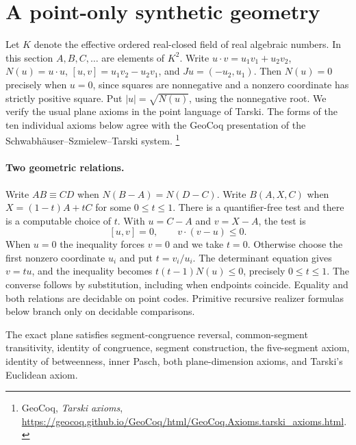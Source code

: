 \section{A point-only synthetic geometry}
\label{sec:synthetic}
Let $K$ denote the effective ordered real-closed field of real algebraic
numbers. In this section $A,B,C,\ldots$ are elements of $K^2$. Write
$u\cdot v=u_1v_1+u_2v_2$, $N(u)=u\cdot u$,
$[u,v]=u_1v_2-u_2v_1$, and $Ju=(-u_2,u_1)$. Then
$N(u)=0$ precisely when $u=0$, since squares are nonnegative and a
nonzero coordinate has strictly positive square. Put
$|u|=\sqrt{N(u)}$, using the nonnegative root.
We verify the usual plane axioms in the point language of Tarski.
The forms of the ten individual axioms below agree with the GeoCoq
presentation of the Schwabh\"auser--Szmielew--Tarski system.%
\footnote{GeoCoq, \emph{Tarski axioms},
\url{https://geocoq.github.io/GeoCoq/html/GeoCoq.Axioms.tarski_axioms.html}.}

\paragraph{Two geometric relations.}
Write $AB\equiv CD$ when $N(B-A)=N(D-C)$. Write $B(A,X,C)$ when
$X=(1-t)A+tC$ for some $0\leq t\leq1$. There is a quantifier-free test
and there is a computable choice of $t$. With $u=C-A$ and $v=X-A$,
the test is
\[
 [u,v]=0,\qquad v\cdot(v-u)\leq0 .
\]
When $u=0$ the inequality forces $v=0$ and we take $t=0$.
Otherwise choose the first nonzero coordinate $u_i$ and put $t=v_i/u_i$.
The determinant equation gives $v=tu$, and the inequality becomes
$t(t-1)N(u)\leq0$, precisely $0\leq t\leq1$. The converse follows
by substitution, including when endpoints coincide. Equality and both
relations are decidable on point codes. Primitive recursive realizer
formulas below branch only on decidable comparisons.

\begin{theorem}
The exact plane satisfies segment-congruence reversal, common-segment
transitivity, identity of congruence, segment construction,
the five-segment axiom, identity of betweenness, inner Pasch,
both plane-dimension axioms, and Tarski's Euclidean axiom.
\end{theorem}

